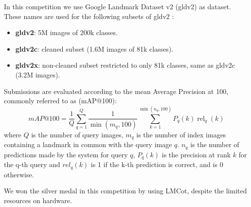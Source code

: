 In this competition we use Google Landmark Dataset v2 \cite{weyand2020google} (gldv2) as dataset. These names are used for the following subsets of gldv2 \cite{henkel2021efficient}:
\begin{itemize}
    \item \textbf{gldv2}: 5M images of 200k classes.
    \item \textbf{gldv2c}: cleaned subset (1.6M images of 81k classes).
    \item \textbf{gldv2x}: non-cleaned subset restricted to only 81k classes, same as gldv2c (3.2M images).
\end{itemize}

Submissions are evaluated according to the mean Average Precision at 100, commonly referred to as (mAP@100):
\begin{equation}
\label{equation08}
    m A P @ 100=\frac{1}{Q} \sum_{q=1}^{Q} \frac{1}{\min \left(m_{q}, 100\right)} \sum_{k=1}^{\min \left(n_{q}, 100\right)} P_{q}(k) \operatorname{rel}_{q}(k)
\end{equation}
where $Q$ is the number of query images, ${{m}_{q}}$ is the number of index images containing a landmark in common with the query image $q$. ${{n}_{q}}$ is the number of predictions made by the system for query $q$, ${{P}_{q}}\left( k \right)$ is the precision at rank $k$ for the q-th query and $re{{l}_{q}}\left( k \right)$ is 1 if the k-th prediction is correct, and is 0 otherwise.


We won the silver medal in this competition by using LMCot, despite the limited resources on hardware.

